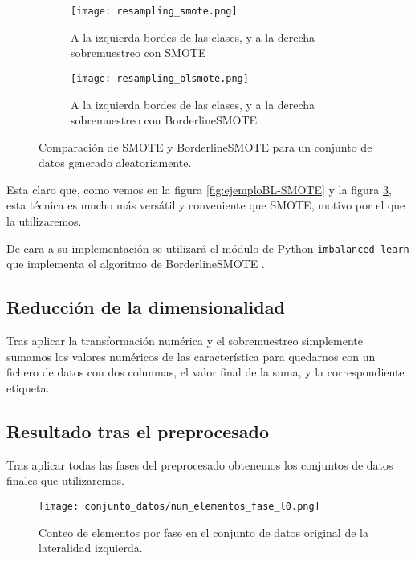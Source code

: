 \begin{figure}[H]
    \centering
	 \begin{subfigure}[b]{\textwidth}
		 \centering
		 \texttt{[image: resampling\_smote.png]}
		 \caption{A la izquierda bordes de las clases, y a la derecha sobremuestreo con SMOTE}
		 \label{fig:SMOTE-cmp}
	 \end{subfigure}

    \begin{subfigure}[b]{\textwidth}
		 \centering
		  \texttt{[image: resampling\_blsmote.png]}
        \caption{A la izquierda bordes de las clases, y a la derecha sobremuestreo con BorderlineSMOTE}
        \label{fig:BLSMOTE-cmp}
    \end{subfigure}

    \caption{Comparación de SMOTE y BorderlineSMOTE para un conjunto de datos generado aleatoriamente.}\label{fig:BLSMOTE-SMOTE}

\end{figure}

Esta claro que, como vemos en la figura \ref{fig:ejemploBL-SMOTE} y la figura \ref{fig:BLSMOTE-SMOTE}, esta técnica es mucho más versátil y conveniente que SMOTE, motivo por el que la utilizaremos.


De cara a su implementación se utilizará el módulo de Python \texttt{imbalanced-learn} que implementa el algoritmo de BorderlineSMOTE \cite{imblearnBLSMOTE}.


\subsection{Reducción de la dimensionalidad}

Tras aplicar la transformación numérica y el sobremuestreo simplemente sumamos los valores numéricos de las característica para quedarnos con un fichero de datos con dos columnas, el valor final de la suma, y la correspondiente etiqueta.

\newpage

\subsection{Resultado tras el preprocesado}

Tras aplicar todas las fases del preprocesado obtenemos los conjuntos de datos finales que utilizaremos.

\begin{figure}[H]
    \centering
	  \texttt{[image: conjunto\_datos/num\_elementos\_fase\_l0.png]}
    \caption{Conteo de elementos por fase en el conjunto de datos original de la lateralidad izquierda.}
	 \label{fig:l0-orig}
\end{figure}


